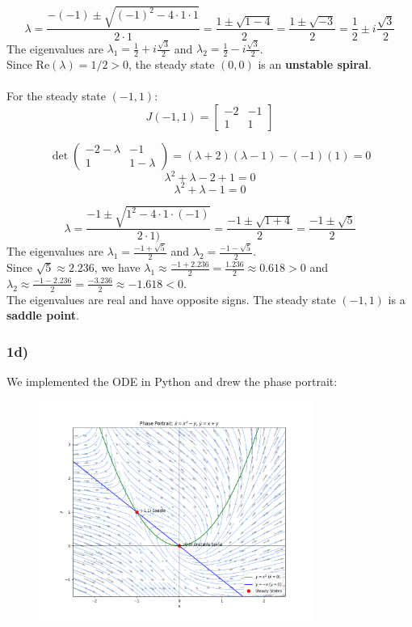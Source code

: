 \documentclass[]{scrartcl}
\begin{document}
$$\lambda = \frac{-(-1) \pm \sqrt{(-1)^2 - 4 \cdot 1 \cdot 1}}{2 \cdot 1} = \frac{1 \pm \sqrt{1-4}}{2} = \frac{1 \pm \sqrt{-3}}{2} = \frac{1}{2} \pm i\frac{\sqrt{3}}{2}$$
The eigenvalues are $\lambda_1 = \frac{1}{2} + i\frac{\sqrt{3}}{2}$ and $\lambda_2 = \frac{1}{2} - i\frac{\sqrt{3}}{2}$.
\\
Since $\mathrm{Re}(\lambda) = 1/2 > 0$, the steady state $(0,0)$ is an \textbf{unstable spiral}.
\\
\\
For the steady state $(-1,1)$:
$$J(-1,1) = \begin{bmatrix} -2 & -1 \\ 1 & 1 \end{bmatrix}$$

$$\det \begin{pmatrix} -2-\lambda & -1 \\ 1 & 1-\lambda \end{pmatrix} = (\lambda+2)(\lambda-1) - (-1)(1) = 0$$
$$\lambda^2 + \lambda - 2 + 1 = 0$$
$$\lambda^2 + \lambda - 1 = 0$$

$$\lambda = \frac{-1 \pm \sqrt{1^2 - 4 \cdot 1 \cdot (-1)}}{2 \cdot 1)} = \frac{-1 \pm \sqrt{1+4}}{2} = \frac{-1 \pm \sqrt{5}}{2}$$
The eigenvalues are $\lambda_1 = \frac{-1 + \sqrt{5}}{2}$ and $\lambda_2 = \frac{-1 - \sqrt{5}}{2}$.
\\
Since $\sqrt{5} \approx 2.236$, we have $\lambda_1 \approx \frac{-1 + 2.236}{2} = \frac{1.236}{2} \approx 0.618 > 0$ and $\lambda_2 \approx \frac{-1 - 2.236}{2} = \frac{-3.236}{2} \approx -1.618 < 0$.
\\
The eigenvalues are real and have opposite signs. The steady state $(-1,1)$ is a \textbf{saddle point}.





\subsubsection*{1d)}

We implemented the ODE in Python and drew the phase portrait:

\begin{figure}[H]
    \centering
    \includegraphics[width=0.8\textwidth]{phase_portrait_1.png}
\end{figure}
\end{document}
